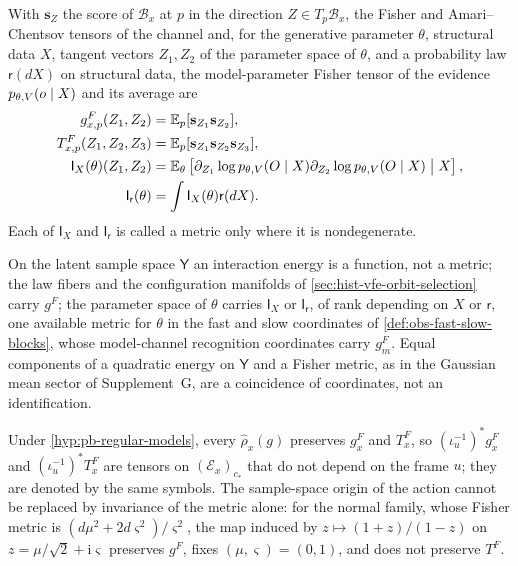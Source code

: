With $\mathbf s_Z$ the score of $\mathcal B_x$ at $p$ in the direction
$Z\in T_p\mathcal B_x$, the Fisher and Amari--Chentsov tensors of the channel and, for
the generative parameter $\theta$, structural data $X$, tangent vectors $Z_1,Z_2$ of the
parameter space of $\theta$, and a probability law $\mathsf r(dX)$ on structural data,
the model-parameter Fisher tensor of the evidence $p_{\theta,V}(o\mid X)$ and its
average are
\begin{align}
g^F_{x,p}(Z_1,Z_2)&=\mathbb E_p[\mathbf s_{Z_1}\mathbf s_{Z_2}],
\label{eq:pb-fiber-fisher}\\
T^F_{x,p}(Z_1,Z_2,Z_3)&=\mathbb E_p[\mathbf s_{Z_1}\mathbf s_{Z_2}\mathbf s_{Z_3}],
\label{eq:pb-fiber-amari}\\
\mathsf I_X(\theta)(Z_1,Z_2)&=\mathbb E_\theta\left[\partial_{Z_1}\log p_{\theta,V}(O\mid X)
\partial_{Z_2}\log p_{\theta,V}(O\mid X)\mathrel{\big|}X\right],
\label{eq:ig-conditional-model-fisher}\\
\mathsf I_{\mathsf r}(\theta)&=\int\mathsf I_X(\theta)\mathsf r(dX).
\label{eq:ig-averaged-model-fisher}
\end{align}
Each of $\mathsf I_X$ and $\mathsf I_{\mathsf r}$ is called a metric only where it is
nondegenerate.

On the latent sample space $\mathsf Y$ an interaction energy is a function, not a metric;
the law fibers and the configuration manifolds of \cref{sec:hist-vfe-orbit-selection}
carry $g^F$; the parameter space of $\theta$ carries $\mathsf I_X$ or
$\mathsf I_{\mathsf r}$, of rank depending on $X$ or $\mathsf r$, one available metric for
$\theta$ in the fast and slow coordinates of \cref{def:obs-fast-slow-blocks}, whose
model-channel recognition coordinates carry $g^F_m$.  Equal components of a quadratic
energy on $\mathsf Y$ and a Fisher metric, as in the Gaussian mean sector of
Supplement~G, are a coincidence of coordinates, not an identification.

Under \cref{hyp:pb-regular-models}, every $\widehat\rho_x(g)$ preserves $g^F_x$ and
$T^F_x$, so $(\iota_u^{-1})^*g^F_x$ and $(\iota_u^{-1})^*T^F_x$ are tensors on
$(\mathcal E_x)_{c_*}$ that do not depend on the frame $u$; they are denoted by the same
symbols.  The sample-space origin of the action cannot be replaced by invariance of the
metric alone: for the normal family, whose Fisher metric is
$(d\mu^2+2d\varsigma^2)/\varsigma^2$, the map induced by $z\mapsto(1+z)/(1-z)$ on
$z=\mu/\sqrt2+\mathrm i\varsigma$ preserves $g^F$, fixes $(\mu,\varsigma)=(0,1)$, and
does not preserve $T^F$.  

